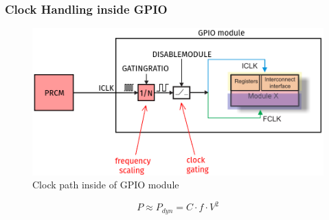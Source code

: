 \documentclass[aspectratio=169,usenames,dvipsnames]{beamer}
\begin{document}
\begin{frame}
  \frametitle{Clock Handling inside GPIO}
    \begin{figure}
      \centering
      \includegraphics[scale=0.3]{images/gpio-clock.png}
      \caption{Clock path inside of GPIO module}
  \end{figure}
  \[ P \approx P_{dyn} = C \cdot f \cdot V^2 \]
\end{frame}
\end{document}
